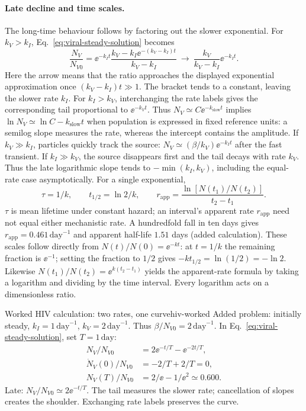 \paragraph{Late decline and time scales.}
The long-time behaviour follows by factoring out the slower exponential. For $k_V>k_I$, Eq.~\eqref{eq:viral-steady-solution} becomes
\begin{equation}\label{eq:viral-slow-factor}
\frac{N_V}{N_{V0}}=\ee^{-k_It}\frac{k_V-k_I\ee^{-(k_V-k_I)t}}{k_V-k_I}
\ \longrightarrow\ \frac{k_V}{k_V-k_I}\ee^{-k_It}.
\end{equation}
Here the arrow means that the ratio approaches the displayed exponential approximation once $(k_V-k_I)t\gg1$. The bracket tends to a constant, leaving the slower rate $k_I$. For $k_I>k_V$, interchanging the rate labels gives the corresponding tail proportional to $\ee^{-k_Vt}$. Thus $N_V\simeq C\ee^{-k_{\mathrm{slow}}t}$ implies $\ln N_V\simeq\ln C-k_{\mathrm{slow}}t$ when population is expressed in fixed reference units: a semilog slope measures the rate, whereas the intercept contains the amplitude.
If $k_V\gg k_I$, particles quickly track the source: $N_V\simeq(\beta/k_V)\ee^{-k_It}$ after the fast transient. If $k_I\gg k_V$, the source disappears first and the tail decays with rate $k_V$. Thus the late logarithmic slope tends to $-\min(k_I,k_V)$, including the equal-rate case asymptotically. For a single exponential,
\begin{equation}\label{eq:decay-scales}
\tau=1/k,\qquad t_{1/2}=\ln2/k,\qquad
r_{\mathrm{app}}=\frac{\ln[N(t_1)/N(t_2)]}{t_2-t_1}.
\end{equation}
$\tau$ is mean lifetime under constant hazard; an interval's apparent rate $r_{\mathrm{app}}$ need not equal either mechanistic rate. A hundredfold fall in ten days gives $r_{\mathrm{app}}=0.461\,\mathrm{day}^{-1}$ and apparent half-life $1.51$ days (added calculation).
These scales follow directly from $N(t)/N(0)=\ee^{-kt}$: at $t=1/k$ the remaining fraction is $\ee^{-1}$; setting the fraction to $1/2$ gives $-kt_{1/2}=\ln(1/2)=-\ln2$. Likewise $N(t_1)/N(t_2)=\ee^{k(t_2-t_1)}$ yields the apparent-rate formula by taking a logarithm and dividing by the time interval. Every logarithm acts on a dimensionless ratio.

\begin{example}[unbreakable,fontupper=\small]{Worked HIV calculation: two rates, one curve}{hiv-worked}
Added problem: initially steady, $k_I=1\,\mathrm{day}^{-1}$, $k_V=2\,\mathrm{day}^{-1}$. Thus $\beta/N_{V0}=2\,\mathrm{day}^{-1}$. In Eq.~\eqref{eq:viral-steady-solution}, set $T=1\,\mathrm{day}$:
\begin{align}
N_V/N_{V0}&=2\ee^{-t/T}-\ee^{-2t/T},\label{eq:worked-curve}\\
\dot N_V(0)/N_{V0}&=-2/T+2/T=0,\label{eq:worked-slope}\\
N_V(T)/N_{V0}&=2/\ee-1/\ee^2\simeq0.600.\label{eq:worked-value}
\end{align}
Late: $N_V/N_{V0}\simeq2\ee^{-t/T}$. The tail measures the slower rate; cancellation of slopes creates the shoulder. Exchanging rate labels preserves the curve.
\end{example}


